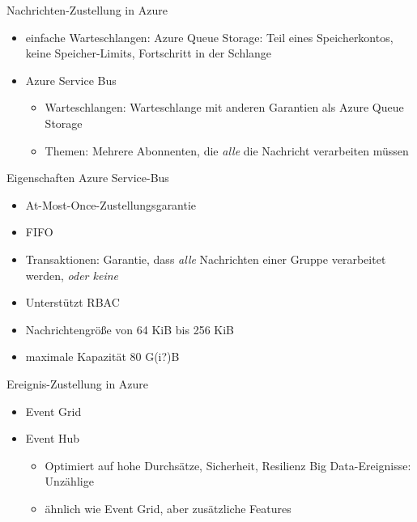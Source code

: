 \begin{flashcard}[Definition]{Nachrichten-Zustellung in Azure}
    \begin{itemize}
        \item einfache Warteschlangen: Azure Queue Storage:\newline
            Teil eines Speicherkontos, keine Speicher-Limits, Fortschritt in der Schlange
        \item Azure Service Bus
            \begin{itemize}
                \item Warteschlangen:\newline
                    Warteschlange mit anderen Garantien als Azure Queue Storage
                \item Themen:\newline
                    Mehrere Abonnenten, die \emph{alle} die Nachricht verarbeiten müssen
            \end{itemize}
    \end{itemize}
\end{flashcard}

\begin{flashcard}[Definition]{Eigenschaften Azure Service-Bus}
    \begin{itemize}
        \item At-Most-Once-Zustellungsgarantie
        \item FIFO
        \item Transaktionen: Garantie, dass \emph{alle} Nachrichten einer Gruppe verarbeitet werden, \emph{oder keine}
        \item Unterstützt RBAC
        \item Nachrichtengröße von 64 KiB bis 256 KiB
        \item maximale Kapazität 80 G(i?)B
    \end{itemize}
\end{flashcard}

\begin{flashcard}[Definition]{Ereignis-Zustellung in Azure}
    \begin{itemize}
        \item Event Grid
        \item Event Hub
            \begin{itemize}
                \item Optimiert auf hohe Durchsätze, Sicherheit, Resilienz\newline
                    Big Data-Ereignisse: Unzählige
                \item ähnlich wie Event Grid, aber zusätzliche Features
            \end{itemize}
    \end{itemize}
\end{flashcard}

